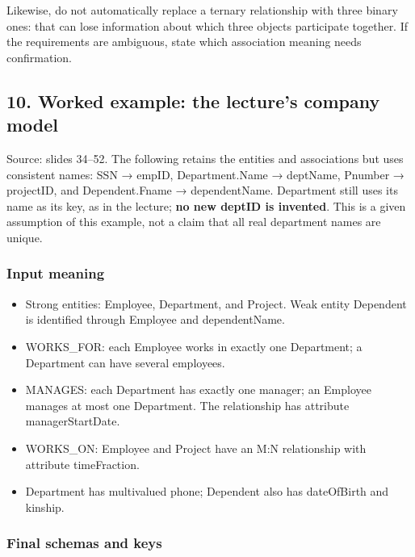 Likewise, do not automatically replace a ternary relationship with three binary ones: that can lose information about which three objects participate together. If the requirements are ambiguous, state which association meaning needs confirmation.

\subsection{10. Worked example: the lecture's company model}\label{04_er_to_relational_mapping_en-worked-example-the-lectures-company-model}

Source: slides 34--52. The following retains the entities and associations but uses consistent names: SSN → empID, Department.Name → deptName, Pnumber → projectID, and Dependent.Fname → dependentName. Department still uses its name as its key, as in the lecture; \textbf{no new deptID is invented}. This is a given assumption of this example, not a claim that all real department names are unique.

\subsubsection{Input meaning}\label{04_er_to_relational_mapping_en-input-meaning}

\begin{itemize}
\tightlist
\item
  Strong entities: Employee, Department, and Project. Weak entity Dependent is identified through Employee and dependentName.
\item
  WORKS\_FOR: each Employee works in exactly one Department; a Department can have several employees.
\item
  MANAGES: each Department has exactly one manager; an Employee manages at most one Department. The relationship has attribute managerStartDate.
\item
  WORKS\_ON: Employee and Project have an M:N relationship with attribute timeFraction.
\item
  Department has multivalued phone; Dependent also has dateOfBirth and kinship.
\end{itemize}

\subsubsection{Final schemas and keys}\label{04_er_to_relational_mapping_en-final-schemas-and-keys}

